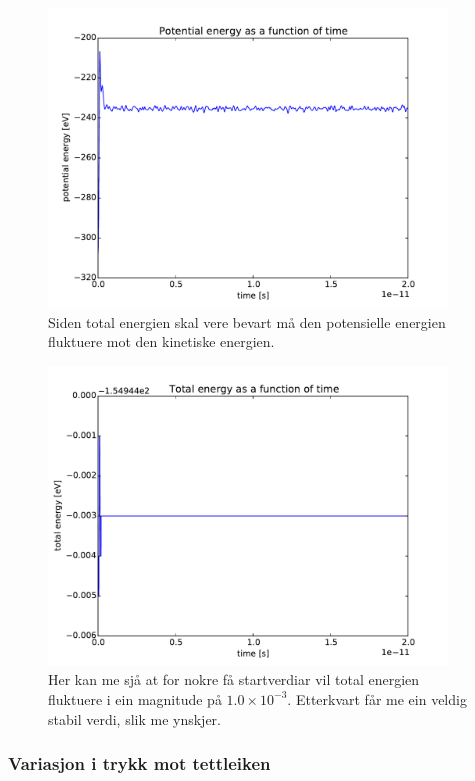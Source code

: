 \documentclass[12pt, a4paper]{article}
\theoremstyle{definition} \newtheorem*{definition}{Teorem}
\begin{document}
            \begin{figure}[H]
                \centering
                \includegraphics[width=400px]{potentialEnergy.pdf}
                \caption{Siden total energien skal vere bevart må den potensielle energien fluktuere mot den kinetiske energien.}
            \end{figure}
            \begin{figure}[H]
                \centering
                \includegraphics[width=400px]{totalEnergy.pdf}
                \caption{Her kan me sjå at for nokre få startverdiar vil total energien fluktuere i ein magnitude på $1.0\times10^{-3}$. Etterkvart får me ein veldig stabil
                         verdi, slik me ynskjer.}
            \end{figure}

        \subsubsection*{Variasjon i trykk mot tettleiken}
\end{document}
